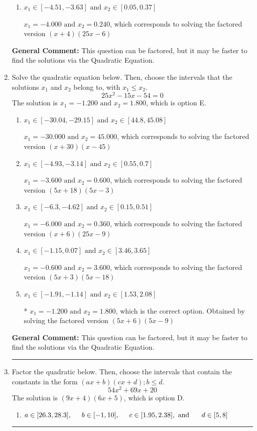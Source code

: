 \documentclass{extbook}[14pt]
\newcommand{\litem}[1]{\item #1

\rule{\textwidth}{0.4pt}}
\begin{document}
\begin{enumerate}
{\begin{enumerate}[label=\Alph*.]
* $x_1 = -0.800 \text{ and } x_2 = 1.200$, which is the correct option. Obtained by solving the factored version $(5x + 4)(5x -6)$
\item \( x_1 \in [-4.51, -3.63] \text{ and } x_2 \in [0.05, 0.37] \)

$x_1 = -4.000 \text{ and } x_2 = 0.240$, which corresponds to solving the factored version $(x + 4)(25x -6)$
\end{enumerate}

\textbf{General Comment:} This question can be factored, but it may be faster to find the solutions via the Quadratic Equation.
}
\litem{
Solve the quadratic equation below. Then, choose the intervals that the solutions $x_1$ and $x_2$ belong to, with $x_1 \leq x_2$.
\[ 25x^{2} -15 x -54 = 0 \]The solution is \( x_1 = -1.200 \text{ and } x_2 = 1.800 \), which is option E.\begin{enumerate}[label=\Alph*.]
\item \( x_1 \in [-30.04, -29.15] \text{ and } x_2 \in [44.8, 45.08] \)

$x_1 = -30.000 \text{ and } x_2 = 45.000$, which corresponds to solving the factored version $(x + 30)(x -45)$
\item \( x_1 \in [-4.93, -3.14] \text{ and } x_2 \in [0.55, 0.7] \)

$x_1 = -3.600 \text{ and } x_2 = 0.600$, which corresponds to solving the factored version $(5x + 18)(5x -3)$
\item \( x_1 \in [-6.3, -4.62] \text{ and } x_2 \in [0.15, 0.51] \)

$x_1 = -6.000 \text{ and } x_2 = 0.360$, which corresponds to solving the factored version $(x + 6)(25x -9)$
\item \( x_1 \in [-1.15, 0.07] \text{ and } x_2 \in [3.46, 3.65] \)

$x_1 = -0.600 \text{ and } x_2 = 3.600$, which corresponds to solving the factored version $(5x + 3)(5x -18)$
\item \( x_1 \in [-1.91, -1.14] \text{ and } x_2 \in [1.53, 2.08] \)

* $x_1 = -1.200 \text{ and } x_2 = 1.800$, which is the correct option. Obtained by solving the factored version $(5x + 6)(5x -9)$
\end{enumerate}

\textbf{General Comment:} This question can be factored, but it may be faster to find the solutions via the Quadratic Equation.
}
\litem{
Factor the quadratic below. Then, choose the intervals that contain the constants in the form $(ax+b)(cx+d); b \leq d.$
\[ 54x^{2} +69 x + 20 \]The solution is \( (9x + 4)(6x + 5) \), which is option D.\begin{enumerate}[label=\Alph*.]
\item \( a \in [26.3, 28.3], \hspace*{5mm} b \in [-1, 10], \hspace*{5mm} c \in [1.95, 2.38], \text{ and } \hspace*{5mm} d \in [5, 8] \)


\end{enumerate}}
\end{enumerate}
\end{document}

